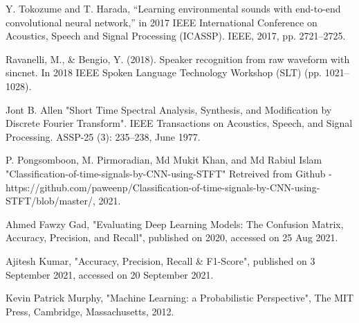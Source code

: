 \documentclass[conference]{IEEEtran}
\begin{document}
\begin{thebibliography}{00}
 Y. Tokozume and T. Harada, “Learning environmental sounds with end-to-end convolutional neural network,” in 2017 IEEE International Conference on Acoustics, Speech and Signal Processing (ICASSP). IEEE, 2017, pp. 2721–2725.

 Ravanelli, M., \& Bengio, Y. (2018). Speaker recognition from raw waveform with sincnet.
In 2018 IEEE Spoken Language Technology Workshop (SLT) (pp. 1021–1028).

 Jont B. Allen "Short Time Spectral Analysis, Synthesis, and Modification by Discrete Fourier Transform". IEEE Transactions on Acoustics, Speech, and Signal Processing. ASSP-25 (3): 235–238, June 1977.

 P. Pongsomboon, M. Pirmoradian, Md Mukit Khan, and Md Rabiul Islam "Classification-of-time-signals-by-CNN-using-STFT" Retreived from Github - https://github.com/paweenp/Classification-of-time-signals-by-CNN-using-STFT/blob/master/, 2021.

 Ahmed Fawzy Gad, "Evaluating Deep Learning Models: The Confusion Matrix, Accuracy, Precision, and Recall", published on 2020, accessed on 25 Aug 2021.

 Ajitesh Kumar, "Accuracy, Precision, Recall \& F1-Score", published on 3 September 2021, accessed on 20 September 2021.

 Kevin Patrick Murphy, "Machine Learning: a Probabilistic Perspective", The MIT Press, Cambridge, Massachusetts, 2012.




\end{thebibliography}
\end{document}
